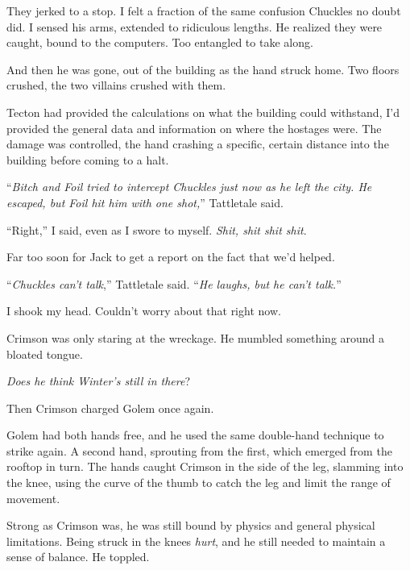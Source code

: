 They jerked to a stop.  I felt a fraction of the same confusion Chuckles no doubt did.  I sensed his arms, extended to ridiculous lengths.  He realized they were caught, bound to the computers.  Too entangled to take along.



And then he was gone, out of the building as the hand struck home.  Two floors crushed, the two villains crushed with them.



Tecton had provided the calculations on what the building could withstand, I'd provided the general data and information on where the hostages were.  The damage was controlled, the hand crashing a specific, certain distance into the building before coming to a halt.



``\emph{Bitch and Foil tried to intercept Chuckles just now as he left the city.  He escaped, but Foil hit him with one shot,}'' Tattletale said.



``Right,'' I said, even as I swore to myself.  \emph{Shit, shit shit shit}.



Far too soon for Jack to get a report on the fact that we'd helped.



``\emph{Chuckles can't talk},'' Tattletale said.  ``\emph{He laughs, but he can't talk.}''



I shook my head.  Couldn't worry about that right now.



Crimson was only staring at the wreckage.  He mumbled something around a bloated tongue.



\emph{Does he think Winter's still in there}?



Then Crimson charged Golem once again.



Golem had both hands free, and he used the same double-hand technique to strike again.  A second hand, sprouting from the first, which emerged from the rooftop in turn.  The hands caught Crimson in the side of the leg, slamming into the knee, using the curve of the thumb to catch the leg and limit the range of movement.



Strong as Crimson was, he was still bound by physics and general physical limitations.  Being struck in the knees \emph{hurt}, and he still needed to maintain a sense of balance.  He toppled.



